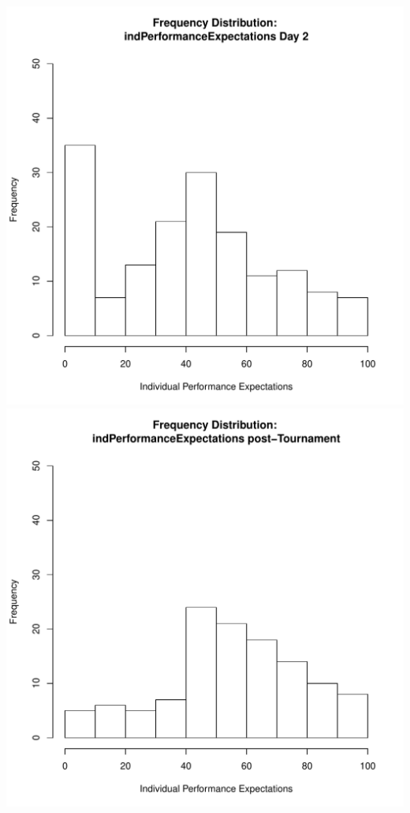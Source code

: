 \documentclass[12pt]{report}
\begin{document}
\includegraphics[scale =.4]{../images/distIndPerfExpDay2.pdf}
\includegraphics[scale =.4]{../images/distIndPerfExpPost.pdf}
\end{document}
